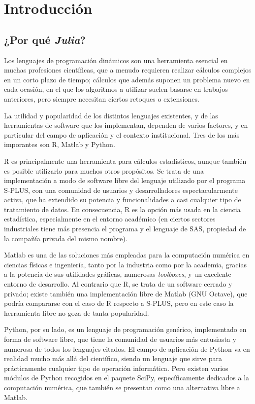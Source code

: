 \chapter{Introducción}

\section{¿Por qué \emph{Julia}?}

Los lenguajes de programación dinámicos son una herramienta esencial en muchas profesiones científicas, que a menudo requieren realizar cálculos complejos en un corto plazo de tiempo; cálculos que además suponen un problema nuevo en cada ocasión, en el que los algoritmos a utilizar suelen basarse en trabajos anteriores, pero siempre necesitan ciertos retoques o extensiones.

La utilidad y popularidad de los distintos lenguajes existentes, y de las herramientas de software que los implementan, dependen de varios factores, y en particular del campo de aplicación y el contexto institucional. Tres de los más imporantes son R, Matlab y Python.

R es principalmente una herramienta para cálculos estadísticos, aunque también es posible utilizarlo para muchos otros propósitos. Se trata de una implementación a modo de software libre del lenguaje utilizado por el programa S-PLUS, con una comunidad de usuarios y desarrolladores espectacularmente activa, que ha extendido su potencia y funcionalidades a casi cualquier tipo de tratamiento de datos. En consecuencia, R es la opción más usada en la ciencia estadística, especialmente en el entorno académico (en ciertos sectores industriales tiene más presencia el programa y el lenguaje de SAS, propiedad de la compañía privada del mismo nombre).

Matlab es una de las soluciones más empleadas para la computación numérica en ciencias físicas e ingeniería, tanto por la industria como por la academia, gracias a la potencia de sus utilidades gráficas, numerosas \emph{toolboxes}, y un excelente entorno de desarrollo. Al contrario que R, se trata de un software cerrado y privado; existe también una implementación libre de Matlab (GNU Octave), que podría compararse con el caso de R respecto a S-PLUS, pero en este caso la herramienta libre no goza de tanta popularidad.

Python, por su lado, es un lenguaje de programación genérico, implementado en forma de software libre, que tiene la comunidad de usuarios más entusiasta y numerosa de todos los lenguajes citados. El campo de aplicación de Python va en realidad mucho más allá del científico, siendo un lenguaje que sirve para prácticamente cualquier tipo de operación informática. Pero existen varios módulos de Python recogidos en el paquete SciPy, específicamente dedicados a la computación numérica, que también se presentan como una alternativa libre a Matlab.

